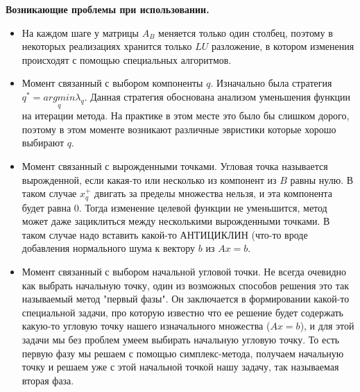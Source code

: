 \textbf{Возникающие проблемы при использовании.}
\begin{itemize}

    \item На каждом шаге у матрицы $A_B$ меняется только один столбец, поэтому в некоторых реализациях хранится только $LU$ разложение, в котором изменения происходят с помощью специальных алгоритмов.

    \item Момент связанный с выбором компоненты $q$. Изначально была стратегия $q^* = \underset{q}{argmin} \lambda_q $. Данная стратегия обоснована анализом уменьшения функции на итерации метода. На практике в этом месте это было бы слишком дорого, поэтому в этом моменте возникают различные эвристики которые хорошо выбирают  $q$.

    \item Момент связанный с вырожденными точками. Угловая точка называется вырожденной, если какая-то или несколько из компонент из $B$ равны нулю. В таком случае $x_q^+$ двигать за пределы множества нельзя, и эта компонента будет равна $0$. Тогда изменение целевой функции не уменьшится, метод может даже зациклиться между несколькими вырожденными точками. В таком случае надо вставить какой-то АНТИЦИКЛИН (что-то вроде добавления нормального шума к вектору $b$ из $Ax = b$.

    \item Момент связанный с выбором начальной угловой точки. Не всегда очевидно как выбрать начальную точку, один из возможных способов решения это так называемый метод "первый фазы". Он заключается в формировании какой-то специальной задачи, про которую известно что ее решение будет содержать какую-то угловую точку нашего изначального множества ($Ax = b$), и для этой задачи мы без проблем умеем выбирать начальную угловую точку. То есть первую фазу мы решаем с помощью симплекс-метода, получаем начальную точку и решаем уже с этой начальной точкой нашу задачу, так называемая вторая фаза.

\end{itemize}